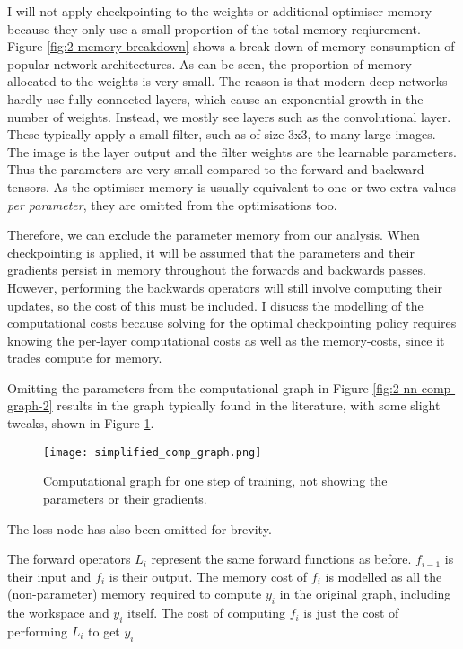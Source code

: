 I will not apply checkpointing to the weights or additional optimiser memory because they only use a small proportion of the total memory reqiurement.
Figure \ref{fig:2-memory-breakdown} shows a break down of memory consumption of popular network architectures.
As can be seen, the proportion of memory allocated to the weights is very small.
The reason is that modern deep networks hardly use fully-connected layers,
which cause an exponential growth in the number of weights.
Instead, we mostly see layers such as the convolutional layer.
These typically apply a small filter, such as of size 3x3, to many large images.
The image is the layer output and the filter weights are the learnable parameters.
Thus the parameters are very small compared to the forward and backward tensors.
As the optimiser memory is usually equivalent to one or two extra values \textit{per parameter},
they are omitted from the optimisations too.

Therefore, we can exclude the parameter memory from our analysis.
When checkpointing is applied, it will be assumed that the parameters and their gradients persist in memory throughout the forwards and backwards passes.
However, performing the backwards operators will still involve computing their updates, so the cost of this must be included.
I disucss the modelling of the computational costs because solving for the optimal checkpointing policy requires knowing the per-layer computational costs as well as the memory-costs, since it trades compute for memory.

Omitting the parameters from the computational graph in Figure \ref{fig:2-nn-comp-graph-2} results in the graph typically found in the literature, with some slight tweaks, shown in Figure \ref{fig:2-simplified-comp-graph}.

\begin{figure}[h]
    \centering
    \texttt{[image: simplified\_comp\_graph.png]}
    \caption{Computational graph for one step of training, not showing the parameters or their gradients.}
    \label{fig:2-simplified-comp-graph}
\end{figure}

The loss node has also been omitted for brevity.

The forward operators \(L_i\) represent the same forward functions as before.
\(f_{i-1}\) is their input and \(f_{i}\) is their output.
The memory cost of \(f_i\) is modelled as all the (non-parameter) memory required to compute \(y_i\) in the original graph, including the workspace and \(y_i\) itself.
The cost of computing \(f_i\) is just the cost of performing \(L_i\) to get \(y_i\)

